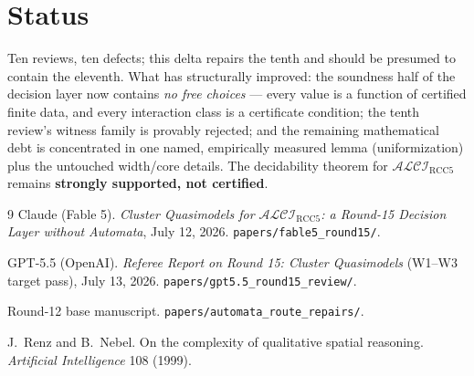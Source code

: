 \documentclass[11pt]{article}
\theoremstyle{definition}
\newcommand{\ALCIRCC}{\mathcal{ALCI}_{\mathrm{RCC5}}}
\newcommand{\code}[1]{\texttt{#1}}
\begin{document}
\section{Status}

Ten reviews, ten defects; this delta repairs the tenth and should be
presumed to contain the eleventh.  What has structurally improved: the
soundness half of the decision layer now contains \emph{no
free choices} --- every value is a function of certified finite data,
and every interaction class is a certificate condition; the tenth
review's witness family is provably rejected; and the remaining
mathematical debt is concentrated in one named, empirically measured
lemma (uniformization) plus the untouched width/core details.  The
decidability theorem for $\ALCIRCC$ remains \textbf{strongly supported,
not certified}.

\begin{thebibliography}{9}
 Claude (Fable 5).  \emph{Cluster Quasimodels for
$\mathcal{ALCI}_{\mathrm{RCC5}}$: a Round-15 Decision Layer without
Automata}, July 12, 2026.  \code{papers/fable5\_round15/}.

 GPT-5.5 (OpenAI).  \emph{Referee Report on Round 15:
Cluster Quasimodels} (W1--W3 target pass), July 13, 2026.
\code{papers/gpt5.5\_round15\_review/}.

 Round-12 base manuscript.
\code{papers/automata\_route\_repairs/}.

 J.~Renz and B.~Nebel.  On the complexity of
qualitative spatial reasoning.  \emph{Artificial Intelligence} 108
(1999).
\end{thebibliography}
\end{document}
